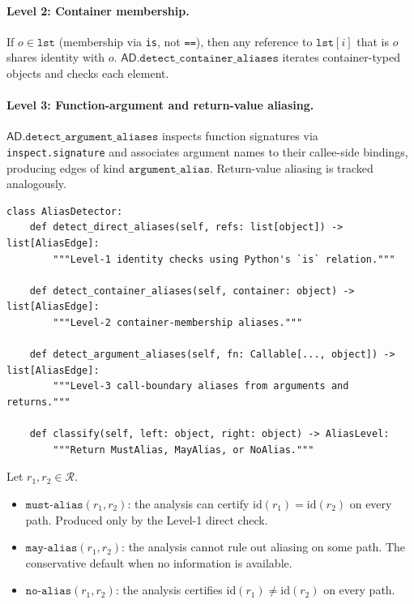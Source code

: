\documentclass[11pt]{article}
\newcommand{\MayAlias}{\ensuremath{\mathtt{may\text{-}alias}}}  %
\newcommand{\MustAlias}{\ensuremath{\mathtt{must\text{-}alias}}} %
\newcommand{\NoAlias}{\ensuremath{\mathtt{no\text{-}alias}}}     %
\newcommand{\AD}{\mathsf{AD}}               %
\begin{document}
\paragraph{Level 2: Container membership.}
If $o \in \mathtt{lst}$ (membership via \texttt{is}, not \texttt{==}),
then any reference to $\mathtt{lst}[i]$ that is $o$ shares identity
with $o$.  $\AD.\mathtt{detect\_container\_aliases}$ iterates
container-typed objects and checks each element.

\paragraph{Level 3: Function-argument and return-value aliasing.}
$\AD.\mathtt{detect\_argument\_aliases}$ inspects function signatures
via \texttt{inspect.signature} and associates argument names to their
callee-side bindings, producing edges of kind
$\mathtt{argument\_alias}$.  Return-value aliasing is tracked
analogously.

\begin{lstlisting}[style=jugeo-python, caption={Core alias-analysis API exposed by the runtime.}]
class AliasDetector:
    def detect_direct_aliases(self, refs: list[object]) -> list[AliasEdge]:
        """Level-1 identity checks using Python's `is` relation."""

    def detect_container_aliases(self, container: object) -> list[AliasEdge]:
        """Level-2 container-membership aliases."""

    def detect_argument_aliases(self, fn: Callable[..., object]) -> list[AliasEdge]:
        """Level-3 call-boundary aliases from arguments and returns."""

    def classify(self, left: object, right: object) -> AliasLevel:
        """Return MustAlias, MayAlias, or NoAlias."""
\end{lstlisting}

\begin{definition}
  \label{def:alias-levels}
  Let $r_1, r_2 \in \mathcal{R}$.
  \begin{itemize}[noitemsep]
    \item $\MustAlias(r_1,r_2)$: the analysis can certify
      $\mathrm{id}(r_1)=\mathrm{id}(r_2)$ on every path.  Produced only
      by the Level-1 direct check.
    \item $\MayAlias(r_1,r_2)$: the analysis cannot rule out aliasing on
      some path.  The conservative default when no information is
      available.
    \item $\NoAlias(r_1,r_2)$: the analysis certifies
      $\mathrm{id}(r_1)\neq\mathrm{id}(r_2)$ on every path.
  \end{itemize}
\end{definition}
\end{document}
